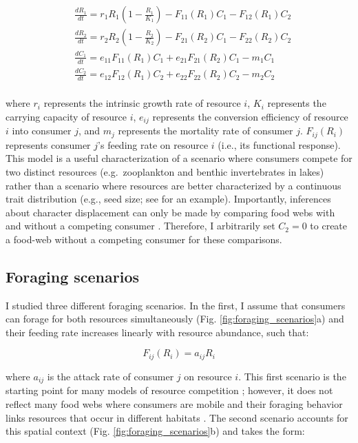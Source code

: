\documentclass[11pt,]{article}
\begin{document}
\begin{equation} \label{eq:1}
  \begin{split}
     & \frac{dR_1}{dt}=r_1R_1(1-\frac{R_1}{K_1})-F_{11}(R_1)C_1-F_{12}(R_1)C_2 \\
     & \frac{dR_2}{dt}=r_2R_2(1-\frac{R_2}{K_2})-F_{21}(R_2)C_1-F_{22}(R_2)C_2 \\
     & \frac{dC_1}{dt}=e_{11}F_{11}(R_1)C_1+e_{21}F_{21}(R_2)C_1-m_1C_1 \\
     & \frac{dC_2}{dt}=e_{12}F_{12}(R_1)C_2+e_{22}F_{22}(R_2)C_2-m_2C_2 \\
  \end{split}
\end{equation}

where \(r_i\) represents the intrinsic growth rate of resource \(i\),
\(K_i\) represents the carrying capacity of resource \(i\), \(e_{ij}\)
represents the conversion efficiency of resource \(i\) into consumer
\(j\), and \(m_j\) represents the mortality rate of consumer \(j\).
\(F_{ij}(R_i)\) represents consumer \(j\)'s feeding rate on resource
\(i\) (i.e., its functional response). This model is a useful
characterization of a scenario where consumers compete for two distinct
resources (e.g.~zooplankton and benthic invertebrates in lakes) rather
than a scenario where resources are better characterized by a continuous
trait distribution (e.g., seed size; see \citet{Taper1985} for an
example). Importantly, inferences about character displacement can only
be made by comparing food webs with and without a competing consumer
\citep{Schluter1992}. Therefore, I arbitrarily set \(C_2=0\) to create a
food-web without a competing consumer for these comparisons.

\subsection{Foraging scenarios}\label{foraging-scenarios}

I studied three different foraging scenarios. In the first, I assume
that consumers can forage for both resources simultaneously (Fig.
\ref{fig:foraging_scenarios}a) and their feeding rate increases linearly
with resource abundance, such that:

\begin{equation} \label{eq:2}
  F_{ij}(R_i)=a_{ij}R_i
\end{equation}

where \(a_{ij}\) is the attack rate of consumer \(j\) on resource \(i\).
This first scenario is the starting point for many models of resource
competition \citep{MacArthur1972}; however, it does not reflect many
food webs where consumers are mobile and their foraging behavior links
resources that occur in different habitats \citep{McCann2005}. The
second scenario accounts for this spatial context (Fig.
\ref{fig:foraging_scenarios}b) and takes the form:
\end{document}
